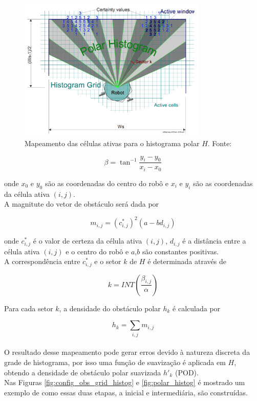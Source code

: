 \begin{figure}[H]
    \centering
    \includegraphics[width=0.8\textwidth]{img/map_grid_polar}
    \caption{Mapeamento das células ativas para o histograma polar $H$. Fonte: \cite{c1}}
    \label{fig:map_grid_polar}
\end{figure}

$$\beta = \tan^{-1}\frac{y_{i}-y_{0}}{x_{i}-x_{0}}$$

onde $x_{0}$ e $y_{0}$ são as coordenadas do centro do robô e $x_{i}$ e $y_{i}$ são as coordenadas da célula ativa $(i,j)$.
\\

A magnitute do vetor de obstáculo será dada por

$$m_{i,j} = (c^{*}_{i,j})^{2} (a - bd_{i,j})$$

onde $c^{*}_{i,j}$ é o valor de certeza da célula ativa $(i,j)$, $d_{i,j}$ é a distância entre a célula ativa $(i,j)$ e o centro do robô e $a$,$b$ são constantes positivas.
\\

A correspondência entre $c^{*}_{i,j}$ e o setor $k$ de $H$ é determinada através de

$$k = INT(\frac{\beta_{i,j}}{\alpha})$$

Para cada setor $k$, a densidade do obstáculo polar $h_{k}$ é calculada por

$$h_{k} = \sum_{i,j} m_{i,j}$$
\\

O resultado desse mapeamento pode gerar erros devido à natureza discreta da grade de histograma, por isso uma função de suavização é aplicada em $H$, obtendo a densidade de obstáculo polar suavizada $h'_{k}$ (POD).
\\

Nas Figuras \ref{fig:config_obs_grid_histog} e \ref{fig:polar_histog} é mostrado um exemplo de como essas duas etapas, a inicial e intermediária, são construídas.

